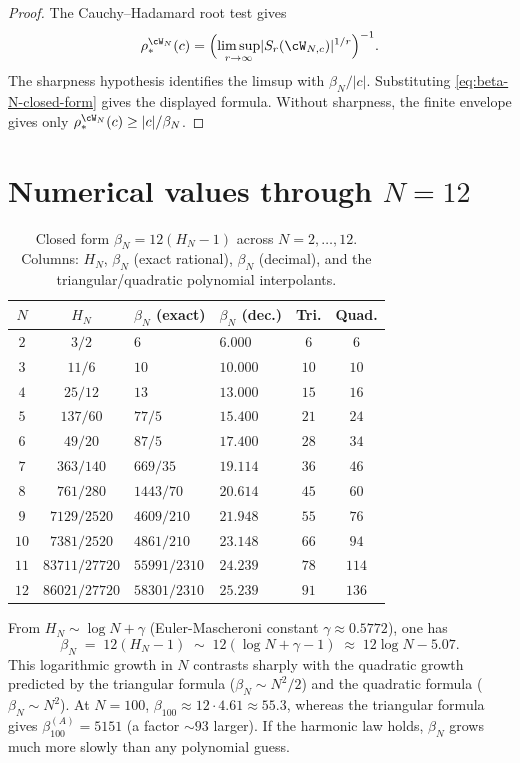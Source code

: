 \begin{proof}
The Cauchy--Hadamard root test gives
\[
 \rho_*^{\cW_N}(c)
 =
 \Bigl(\limsup_{r\to\infty}
 \lvert S_r(\cW_{N,c})\rvert^{1/r}\Bigr)^{-1}.
\]
The sharpness hypothesis identifies the limsup with $\beta_N/|c|$.
Substituting \eqref{eq:beta-N-closed-form} gives the displayed formula.
Without sharpness, the finite envelope gives only
$\rho_*^{\cW_N}(c)\ge |c|/\beta_N$.
\end{proof}

\section{Numerical values through $N = 12$}
\label{sec:beta-N-extended-table}

\begin{table}[h]
\centering
\caption{Closed form $\beta_N = 12(H_N - 1)$ across $N = 2, \ldots, 12$.
Columns: $H_N$, $\beta_N$ (exact rational), $\beta_N$ (decimal), and
the triangular/quadratic polynomial interpolants.}
\label{tab:beta-N-values-extended}
\renewcommand{\arraystretch}{1.2}
\begin{tabular}{|c|c|l|l|c|c|}
\hline
$N$ & $H_N$ & $\beta_N$ (exact) & $\beta_N$ (dec.) & Tri. & Quad. \\
\hline
$2$ & $3/2$ & $6$ & $6.000$ & $6$ & $6$ \\
$3$ & $11/6$ & $10$ & $10.000$ & $10$ & $10$ \\
$4$ & $25/12$ & $13$ & $13.000$ & $15$ & $16$ \\
$5$ & $137/60$ & $77/5$ & $15.400$ & $21$ & $24$ \\
$6$ & $49/20$ & $87/5$ & $17.400$ & $28$ & $34$ \\
$7$ & $363/140$ & $669/35$ & $19.114$ & $36$ & $46$ \\
$8$ & $761/280$ & $1443/70$ & $20.614$ & $45$ & $60$ \\
$9$ & $7129/2520$ & $4609/210$ & $21.948$ & $55$ & $76$ \\
$10$ & $7381/2520$ & $4861/210$ & $23.148$ & $66$ & $94$ \\
$11$ & $83711/27720$ & $55991/2310$ & $24.239$ & $78$ & $114$ \\
$12$ & $86021/27720$ & $58301/2310$ & $25.239$ & $91$ & $136$ \\
\hline
\end{tabular}
\end{table}

\begin{remark}
\label{rem:beta-asymptotic}
From $H_N \sim \log N + \gamma$ (Euler-Mascheroni constant
$\gamma \approx 0.5772$), one has
\[
 \beta_N
 \;=\;
 12(H_N - 1)
 \;\sim\;
 12 (\log N + \gamma - 1)
 \;\approx\;
 12 \log N - 5.07.
\]
This logarithmic growth in $N$ contrasts sharply with the quadratic
growth predicted by the triangular formula ($\beta_N \sim N^2/2$) and
the quadratic formula ($\beta_N \sim N^2$). At $N = 100$,
$\beta_{100} \approx 12 \cdot 4.61 \approx 55.3$, whereas the
triangular formula gives $\beta_{100}^{(A)} =
5151$ (a factor $\sim 93$ larger). If the harmonic law holds,
$\beta_N$ grows much more slowly than any polynomial guess.
\end{remark}

